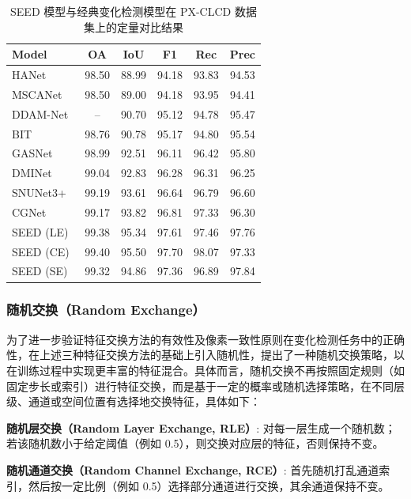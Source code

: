 \begin{table}[!htbp]
\centering
\caption{SEED 模型与经典变化检测模型在 PX-CLCD 数据集上的定量对比结果}
\label{tab:seed_pxclcd}
\begin{tabular}{lccccc}
\hline
\textbf{Model} & \textbf{OA} & \textbf{IoU} & \textbf{F1} & \textbf{Rec} & \textbf{Prec} \\
\hline
HANet~\cite{Han2024HANetAH}         & 98.50 & 88.99 & 94.18 & 93.83 & 94.53 \\
MSCANet~\cite{m_liu_cnn-transformer_2022}       & 98.50 & 89.00 & 94.18 & 93.95 & 94.41 \\
DDAM-Net~\cite{feng_ddam-net_2024} & -- & 90.70 & 95.12 & 94.78 & 95.47 \\
BIT~\cite{chen_remote_2022}           & 98.76 & 90.78 & 95.17 & 94.80 & 95.54 \\
GASNet~\cite{zhang_global-aware_2023}    & 98.99 & 92.51 & 96.11 & 96.42 & 95.80 \\
DMINet~\cite{feng_change_2023}         & 99.04 & 92.83 & 96.28 & 96.31 & 96.25 \\
SNUNet3+~\cite{miao_snunet3_2024}     & 99.19 & 93.61 & 96.64 & 96.79 & 96.60 \\
CGNet~\cite{han_change_2023}         & 99.17 & 93.82 & 96.81 & 97.33 & 96.30 \\
\hline
SEED (LE)          & 99.38 & 95.34 & 97.61 & 97.46 & 97.76 \\
SEED (CE)          & 99.40	& 95.50	& 97.70	& 98.07	& 97.33 \\
SEED (SE)          & 99.32 & 94.86 & 97.36 & 96.89 & 97.84 \\
\hline
\end{tabular}
\end{table}

\subsubsection{随机交换（Random Exchange）}
为了进一步验证特征交换方法的有效性及像素一致性原则在变化检测任务中的正确性，在上述三种特征交换方法的基础上引入随机性，提出了一种随机交换策略，以在训练过程中实现更丰富的特征混合。具体而言，随机交换不再按照固定规则（如固定步长或索引）进行特征交换，而是基于一定的概率或随机选择策略，在不同层级、通道或空间位置有选择地交换特征，具体如下：

\textbf{随机层交换（Random Layer Exchange, RLE）}: 对每一层生成一个随机数；若该随机数小于给定阈值（例如 0.5），则交换对应层的特征，否则保持不变。

\textbf{随机通道交换（Random Channel Exchange, RCE）}: 首先随机打乱通道索引，然后按一定比例（例如 0.5）选择部分通道进行交换，其余通道保持不变。

